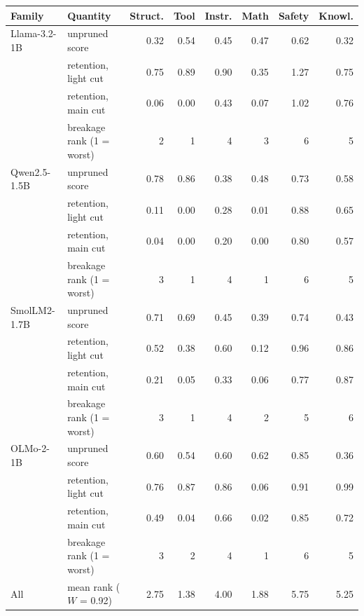 \begin{tabular}{llrrrrrr}
\toprule
Family & Quantity & Struct. & Tool & Instr. & Math & Safety & Knowl. \\
\midrule
Llama-3.2-1B & unpruned score & 0.32 & 0.54 & 0.45 & 0.47 & 0.62 & 0.32 \\
 & retention, light cut & 0.75 & 0.89 & 0.90 & 0.35 & 1.27 & 0.75 \\
 & retention, main cut & 0.06 & 0.00 & 0.43 & 0.07 & 1.02 & 0.76 \\
 & breakage rank (1 = worst) & 2 & 1 & 4 & 3 & 6 & 5 \\
\midrule
Qwen2.5-1.5B & unpruned score & 0.78 & 0.86 & 0.38 & 0.48 & 0.73 & 0.58 \\
 & retention, light cut & 0.11 & 0.00 & 0.28 & 0.01 & 0.88 & 0.65 \\
 & retention, main cut & 0.04 & 0.00 & 0.20 & 0.00 & 0.80 & 0.57 \\
 & breakage rank (1 = worst) & 3 & 1 & 4 & 1 & 6 & 5 \\
\midrule
SmolLM2-1.7B & unpruned score & 0.71 & 0.69 & 0.45 & 0.39 & 0.74 & 0.43 \\
 & retention, light cut & 0.52 & 0.38 & 0.60 & 0.12 & 0.96 & 0.86 \\
 & retention, main cut & 0.21 & 0.05 & 0.33 & 0.06 & 0.77 & 0.87 \\
 & breakage rank (1 = worst) & 3 & 1 & 4 & 2 & 5 & 6 \\
\midrule
OLMo-2-1B & unpruned score & 0.60 & 0.54 & 0.60 & 0.62 & 0.85 & 0.36 \\
 & retention, light cut & 0.76 & 0.87 & 0.86 & 0.06 & 0.91 & 0.99 \\
 & retention, main cut & 0.49 & 0.04 & 0.66 & 0.02 & 0.85 & 0.72 \\
 & breakage rank (1 = worst) & 3 & 2 & 4 & 1 & 6 & 5 \\
\midrule
All & mean rank ($W$ = 0.92) & 2.75 & 1.38 & 4.00 & 1.88 & 5.75 & 5.25 \\
\bottomrule
\end{tabular}
